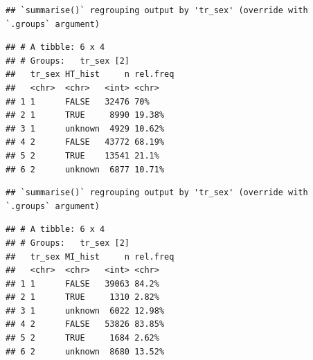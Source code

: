 \documentclass[
]{article}
\newenvironment{Shaded}{\begin{snugshade}}{\end{snugshade}}
\newcommand{\DataTypeTok}[1]{\textcolor[rgb]{0.13,0.29,0.53}{#1}}
\newcommand{\DecValTok}[1]{\textcolor[rgb]{0.00,0.00,0.81}{#1}}
\newcommand{\KeywordTok}[1]{\textcolor[rgb]{0.13,0.29,0.53}{\textbf{#1}}}
\newcommand{\NormalTok}[1]{#1}
\newcommand{\OperatorTok}[1]{\textcolor[rgb]{0.81,0.36,0.00}{\textbf{#1}}}
\newcommand{\OtherTok}[1]{\textcolor[rgb]{0.56,0.35,0.01}{#1}}
\newcommand{\StringTok}[1]{\textcolor[rgb]{0.31,0.60,0.02}{#1}}
\begin{document}
\begin{verbatim}
## `summarise()` regrouping output by 'tr_sex' (override with `.groups` argument)
\end{verbatim}

\begin{verbatim}
## # A tibble: 6 x 4
## # Groups:   tr_sex [2]
##   tr_sex HT_hist     n rel.freq
##   <chr>  <chr>   <int> <chr>   
## 1 1      FALSE   32476 70%     
## 2 1      TRUE     8990 19.38%  
## 3 1      unknown  4929 10.62%  
## 4 2      FALSE   43772 68.19%  
## 5 2      TRUE    13541 21.1%   
## 6 2      unknown  6877 10.71%
\end{verbatim}

\begin{Shaded}
\end{Shaded}

\begin{verbatim}
## `summarise()` regrouping output by 'tr_sex' (override with `.groups` argument)
\end{verbatim}

\begin{verbatim}
## # A tibble: 6 x 4
## # Groups:   tr_sex [2]
##   tr_sex MI_hist     n rel.freq
##   <chr>  <chr>   <int> <chr>   
## 1 1      FALSE   39063 84.2%   
## 2 1      TRUE     1310 2.82%   
## 3 1      unknown  6022 12.98%  
## 4 2      FALSE   53826 83.85%  
## 5 2      TRUE     1684 2.62%   
## 6 2      unknown  8680 13.52%
\end{verbatim}

\begin{Shaded}
\end{Shaded}
\end{document}
